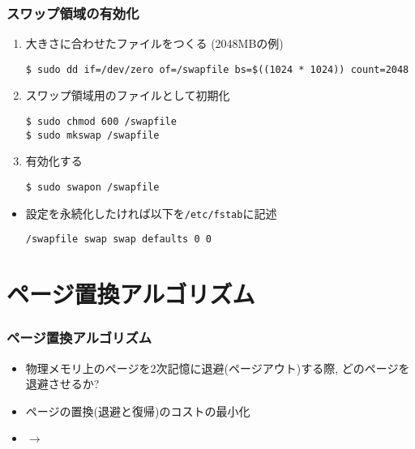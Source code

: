 \documentclass[12pt,dvipdfmx]{beamer}
\begin{document}
\begin{frame}[fragile]
  \frametitle{スワップ領域の有効化}
  \begin{enumerate}
  \item 大きさに合わせたファイルをつくる (2048MBの例)
\begin{lstlisting}
$ sudo dd if=/dev/zero of=/swapfile bs=$((1024 * 1024)) count=2048
\end{lstlisting}
\item スワップ領域用のファイルとして初期化
\begin{lstlisting}
$ sudo chmod 600 /swapfile
$ sudo mkswap /swapfile
\end{lstlisting} %
\item 有効化する
\begin{lstlisting}
$ sudo swapon /swapfile
\end{lstlisting} %
\end{enumerate}
\begin{itemize}
\item [] 設定を永続化したければ以下を{\tt /etc/fstab}に記述
\begin{lstlisting}
/swapfile swap swap defaults 0 0
\end{lstlisting}
\end{itemize}
\end{frame}

\section{ページ置換アルゴリズム}

\begin{frame}
  \frametitle{ページ置換アルゴリズム}
  \begin{itemize}
  \item {} 物理メモリ上のページを2次記憶に退避(ページアウト)する際,
    どのページを退避させるか?
  \item {} ページの置換(退避と復帰)のコストの最小化
  \item $\rightarrow$ 
  \end{itemize}
\end{frame}
\end{document}
